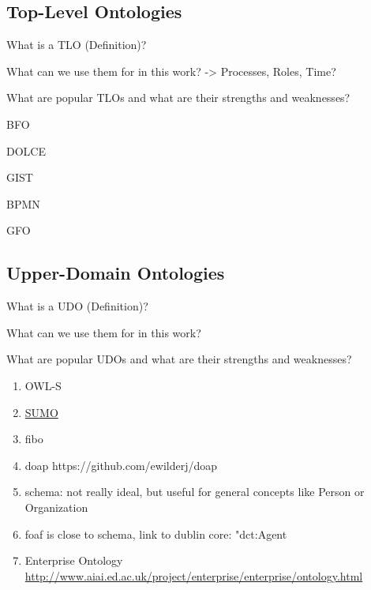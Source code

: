 \documentclass[a4paper, DIV=13, BCOR=0cm]{scrbook}
\begin{document}
\subsection{Top-Level Ontologies}
\begin{compactenum}
	\item What is a TLO (Definition)?
	\item What can we use them for in this work? -> Processes, Roles, Time?
	\item What are popular TLOs and what are their strengths and weaknesses?
	\begin{compactenum}
		\item BFO \cite{smith2015basic} %
		\item DOLCE
		\item GIST
		\item BPMN  \cite{2014foisbpmn}
		\item GFO \cite{herre2010general}
	\end{compactenum}
\end{compactenum}

\subsection{Upper-Domain Ontologies}
\begin{compactenum}
	\item What is a UDO (Definition)?
	\item What can we use them for in this work?
	\item What are popular UDOs and what are their strengths and weaknesses?
	\begin{enumerate}
		\item OWL-S
		\item \href{https://en.wikipedia.org/wiki/Suggested_Upper_Merged_Ontology}{SUMO}
		\item \gls{fibo}
		\item \gls{doap} https://github.com/ewilderj/doap
		\item \gls{schema}: not really ideal, but useful for general concepts like Person or Organization
		\item \gls{foaf} is close to schema, link to dublin core: "dct:Agent
		\item Enterprise Ontology \url{http://www.aiai.ed.ac.uk/project/enterprise/enterprise/ontology.html}
	\end{enumerate}
\end{compactenum}
\end{document}
